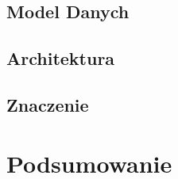 \subsection*{Model Danych}



\subsection*{Architektura}

\subsection*{Znaczenie}

\section{Podsumowanie}